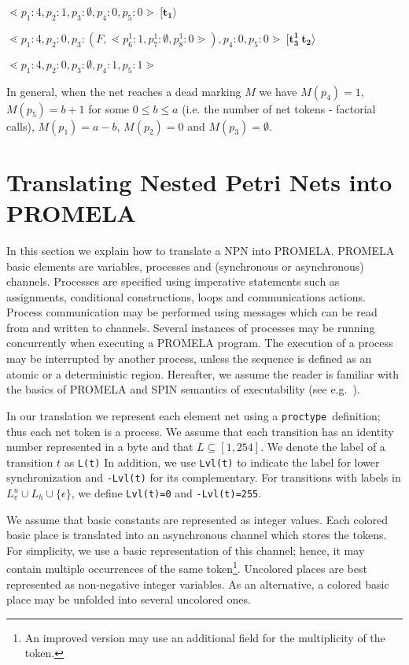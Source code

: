 \documentclass{llncs}
\begin{document}
\begin{example}
\vspace{7pt}
$\lessdot p_1:4,p_2:1,p_3:\emptyset, p_4:0,p_5:0\gtrdot\ \mathbf{[t_1\rangle}$

$\lessdot p_1:4,p_2:0, p_3:(F,\lessdot p_6^1:1,p_7^1:\emptyset,p_8^1:0\gtrdot),p_4:0,p_5:0\gtrdot\ \mathbf{[t^1_3\ t_2\rangle}$

$\lessdot p_1:4,p_2:0,p_3:\emptyset, p_4:1,p_5:1\gtrdot $
\vspace{7pt}

In general, when the net reaches a dead marking $M$ we have $M(p_4)=1$, $M(p_5)=b+1$ for some $0\leq b\leq a$ (i.e.  the number of net tokens - factorial calls), $M(p_1)=a-b$, $M(p_2)=0$ and  $M(p_3)=\emptyset$.
\end{example}




\section{Translating Nested Petri Nets into PROMELA}
\label{sec:rnpn2promela}

In this section we explain how to translate a NPN into PROMELA. PROMELA basic elements are variables, processes and  (synchronous or asynchronous) channels. Processes are specified using imperative statements such as assignments, conditional constructions, loops and communications actions. Process communication may be performed using messages which can be read from and written to channels. Several instances of processes may be running concurrently when executing a PROMELA program. The execution of a process may be interrupted by another process, unless the sequence is defined as an atomic or a deterministic region. Hereafter, we  assume the reader is familiar with the basics of PROMELA  and  SPIN  semantics of executability (see e.g.~\cite{spin}).


In our translation we represent each element net using a \small\verb"proctype"\nfont\ definition; thus each net token is a process.  We assume that each transition has an identity number represented in a byte and that $L\subseteq [1, 254]$. We denote the label of a transition $t$ as \verb"L(t)" In addition, we use \verb"Lvl(t)" to indicate the label for lower synchronization and \verb"-Lvl(t)" for  its complementary. For transitions with labels in $L_v^u\cup L_h\cup\{\epsilon\}$, we define \verb"Lvl(t)=0" and \verb"-Lvl(t)=255". 


We assume that basic constants are represented as integer values. Each colored basic place is translated into an asynchronous channel which stores the tokens. For simplicity, we use a basic representation of this channel; hence, it may contain multiple occurrences of the same token\footnote{An improved version may use an additional field for the multiplicity of the token.}. Uncolored places are best represented as non-negative integer variables.  As an alternative, a colored basic place may be unfolded into several uncolored ones.
\end{document}
